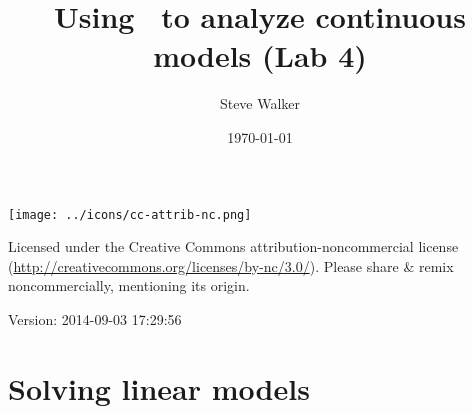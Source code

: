 \documentclass[11pt]{article}\usepackage[]{graphicx}\usepackage[]{color}
\title{Using \R\ to analyze continuous models (Lab 4)}
\date{\today}
\author{Steve Walker}}
\numberwithin{exercise}{section}
\begin{document}
\maketitle

\texttt{[image: ../icons/cc-attrib-nc.png]}

\begin{minipage}[b]{3in}
{\small Licensed under the Creative Commons 
  attribution-noncommercial license
(\url{http://creativecommons.org/licenses/by-nc/3.0/}).
Please share \& remix noncommercially,
mentioning its origin.}
\end{minipage}

Version: 2014-09-03 17:29:56
  
\addtocounter{section}{-1}

\section{Solving linear models}
\end{document}
